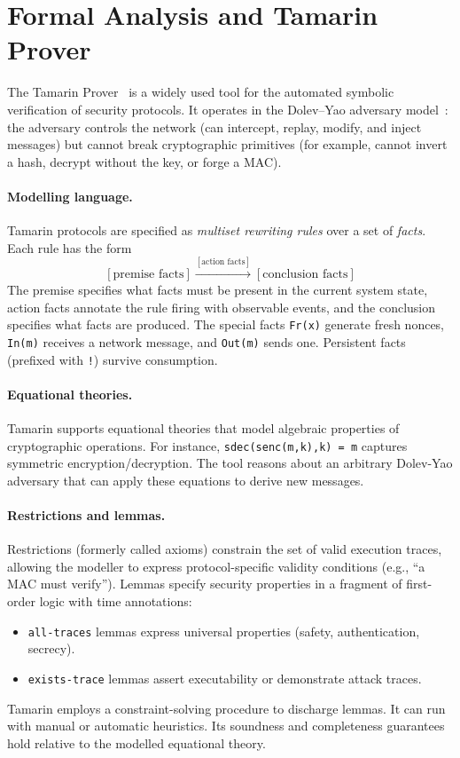 \section{Formal Analysis and Tamarin Prover}
\label{sec:analysis}

The Tamarin Prover~\cite{meier2013tamarin,basin2015tamarin} is a widely used tool for the automated symbolic verification of security protocols. It operates in the Dolev--Yao adversary model~\cite{dolevyao1983}: the adversary controls the network (can intercept, replay, modify, and inject messages) but cannot break cryptographic primitives (for example, cannot invert a hash, decrypt without the key, or forge a MAC).

\paragraph{Modelling language.} Tamarin protocols are specified as \emph{multiset rewriting rules} over a set of \emph{facts}. Each rule has the form
\[
  [\text{premise facts}] \xrightarrow{[\text{action facts}]} [\text{conclusion facts}]
\]
The premise specifies what facts must be present in the current system state, action facts annotate the rule firing with observable events, and the conclusion specifies what facts are produced. The special facts \texttt{Fr(x)} generate fresh nonces, \texttt{In(m)} receives a network message, and \texttt{Out(m)} sends one. Persistent facts (prefixed with \texttt{!}) survive consumption.

\paragraph{Equational theories.} Tamarin supports equational theories that model algebraic properties of cryptographic operations. For instance, \texttt{sdec(senc(m,k),k) = m} captures symmetric encryption/decryption. The tool reasons about an arbitrary Dolev-Yao adversary that can apply these equations to derive new messages.

\paragraph{Restrictions and lemmas.} Restrictions (formerly called axioms) constrain the set of valid execution traces, allowing the modeller to express protocol-specific validity conditions (e.g., ``a MAC must verify''). Lemmas specify security properties in a fragment of first-order logic with time annotations:
\begin{itemize}
  \item \texttt{all-traces} lemmas express universal properties (safety, authentication, secrecy).
  \item \texttt{exists-trace} lemmas assert executability or demonstrate attack traces.
\end{itemize}
Tamarin employs a constraint-solving procedure to discharge lemmas. It can run with manual or automatic heuristics. Its soundness and completeness guarantees hold relative to the modelled equational theory.


